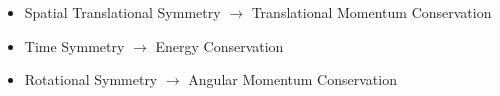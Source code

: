     \begin{itemize}
        \item Spatial Translational Symmetry $\rightarrow$ Translational Momentum Conservation
        \item Time Symmetry $\rightarrow$ Energy Conservation
        \item Rotational Symmetry $\rightarrow$ Angular Momentum Conservation
    \end{itemize}
%
%

%    
%     
%
%
%
%
%
%
%

